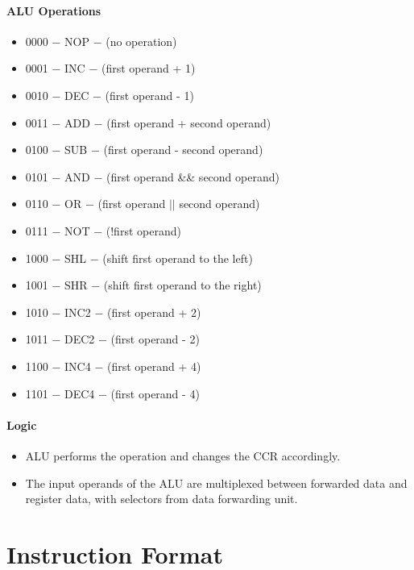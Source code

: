 \documentclass[12pt]{report}
\begin{document}
\subsection{ALU Operations}
\begin{itemize}
    \item 0000 $-$ NOP $-$ (no operation)
    \item 0001 $-$ INC $-$ (first operand + 1)
    \item 0010 $-$ DEC $-$ (first operand - 1)
    \item 0011 $-$ ADD $-$ (first operand + second operand)
    \item 0100 $-$ SUB $-$ (first operand - second operand)
    \item 0101 $-$ AND $-$ (first operand \&\& second operand)
    \item 0110 $-$ OR $-$ (first operand $||$ second operand)
    \item 0111 $-$ NOT $-$ (!first operand)
    \item 1000 $-$ SHL $-$ (shift first operand to the left)
    \item 1001 $-$ SHR $-$ (shift first operand to the right)
    \item 1010 $-$ INC2 $-$ (first operand + 2)
    \item 1011 $-$ DEC2 $-$ (first operand - 2)
    \item 1100 $-$ INC4 $-$ (first operand + 4)
    \item 1101 $-$ DEC4 $-$ (first operand - 4)
\end{itemize}

\subsection{Logic}
\begin{itemize}
    \item ALU performs the operation and changes the CCR accordingly.
    \item The input operands of the ALU are multiplexed between forwarded data and register data, with selectors from data forwarding unit.
\end{itemize}

\part{Instruction Format}
\end{document}
